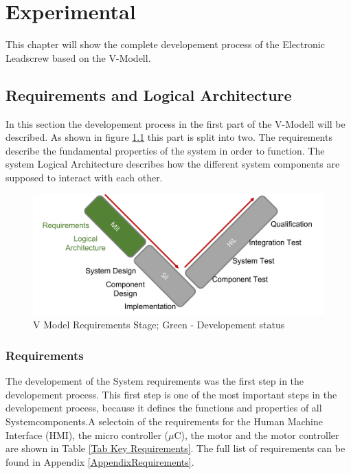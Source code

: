 \chapter{Experimental}
\label{experimental}
This chapter will show the complete developement process of the Electronic Leadscrew based on the V-Modell. 


\section{Requirements and Logical Architecture}

In this section the developement process in the first part of the V-Modell will be described. As shown in figure \ref{V Model Requirements} this part is split into two. The requirements describe the fundamental properties of the system in order to function.
The system Logical Architecture describes how the different system components are supposed to interact with each other.

\begin{figure}
    \begin{center}
    \includegraphics[width=12cm]{Pictures/V Model Requirements.png}
    \caption[V Model Requirements]{V Model Requirements Stage; Green - Developement status}
    \label{V Model Requirements}
    \end{center}
\end{figure}


\subsection{Requirements}
The developement of the System requirements was the first step in the developement process. This first step is one of the most important steps in the developement process, because it defines the functions and properties of all Systemcomponents.A selectoin of the requirements for the Human Machine Interface (HMI), the micro controller ($\mu$C), the motor and the motor controller are shown in Table \ref{Tab Key Requirements}. The full list of requirements can be found in Appendix \ref{AppendixRequirements}.


